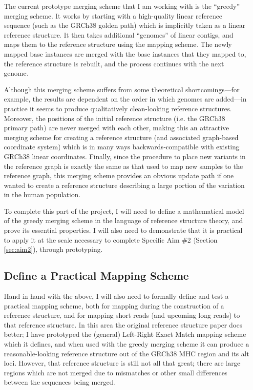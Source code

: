 \documentclass[11pt,proposal]{ucthesis}
\begin{document}
The current prototype merging scheme that I am working with is the ``greedy'' merging scheme. It works by starting with a high-quality linear reference sequence (such as the GRCh38 golden path) which is implicitly taken as a linear reference structure. It then takes additional ``genomes'' of linear contigs, and maps them to the reference structure using the mapping scheme. The newly mapped base instances are merged with the base instances that they mapped to, the reference structure is rebuilt, and the process continues with the next genome. 

Although this merging scheme suffers from some theoretical shortcomings---for example, the results are dependent on the order in which genomes are added---in practice it seems to produce qualitatively clean-looking reference structures. Moreover, the positions of the initial reference structure (i.e. the GRCh38 primary path) are never merged with each other, making this an attractive merging scheme for creating a reference structure (and associated graph-based coordinate system) which is in many ways backwards-compatible with existing GRCh38 linear coordinates. Finally, since the procedure to place new variants in the reference graph is exactly the same as that used to map new samples to the reference graph, this merging scheme provides an obvious update path if one wanted to create a reference structure describing a large portion of the variation in the human population.

To complete this part of the project, I will need to define a mathematical model of the greedy merging scheme in the language of reference structure theory, and prove its essential properties. I will also need to demonstrate that it is practical to apply it at the scale necessary to complete Specific Aim \#2 (Section \ref{sec:aim2}), through prototyping.

\subsection{Define a Practical Mapping Scheme}

Hand in hand with the above, I will also need to formally define and test a practical mapping scheme, both for mapping during the construction of a reference structure, and for mapping short reads (and upcoming long reads) to that reference structure. In this area the original reference structure paper does better; I have prototyped the (general) Left-Right Exact Match mapping scheme which it defines, and when used with the greedy merging scheme it can produce a reasonable-looking reference structure out of the GRCh38 MHC region and its alt loci. However, that reference structure is still not all that great; there are large regions which are not merged due to mismatches or other small differences between the sequences being merged.
\end{document}
